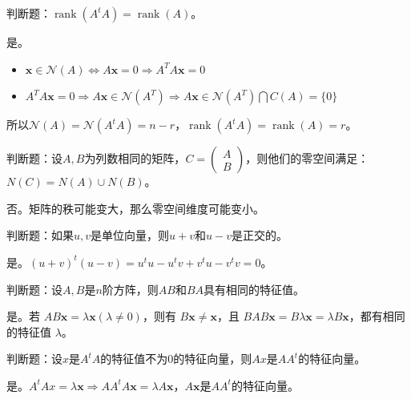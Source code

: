 \begin{problem}
	判断题：$\operatorname{rank}(A^tA)=\operatorname{rank}(A)$。
\end{problem}
\begin{solution}
	是。

	\begin{itemize}
		\item $\boldsymbol{x} \in \mathcal{N}(A) \Leftrightarrow A \boldsymbol{x}=0 \Rightarrow A^{T} A \boldsymbol{x}=0$
		\item $ A^{T} A \boldsymbol{x}=0 \Rightarrow A \boldsymbol{x} \in \mathcal{N}\left(A^{T}\right) \Rightarrow A \boldsymbol{x} \in \mathcal{N}\left(A^{T}\right) \bigcap C(A)=\{0\}$
	\end{itemize}
	
	所以$\mathcal{N}(A) = \mathcal{N}(A^tA) = n - r$，$\operatorname{rank}(A^tA) = \operatorname{rank}(A) = r$。
\end{solution}


\begin{problem}
	判断题：设$A,B$为列数相同的矩阵，$C=\begin{pmatrix}A\\B\end{pmatrix}$，则他们的零空间满足：$N(C)=N(A)\cup N(B)$。
\end{problem}
\begin{solution}
	否。矩阵的秩可能变大，那么零空间维度可能变小。
\end{solution}


\begin{problem}
	判断题：如果$u,v$是单位向量，则$u+v$和$u-v$是正交的。
\end{problem}
\begin{solution}
	是。$(u + v)^t(u - v) = u^tu - u^tv + v^tu - v^tv = 0$。
\end{solution}


\begin{problem}
	判断题：设$A,B$是$n$阶方阵，则$AB$和$BA$具有相同的特征值。
\end{problem}
\begin{solution}
	是。若 $AB\boldsymbol{x} = \lambda \boldsymbol{x}(\lambda \neq 0)$，则有 $B\boldsymbol{x} \neq \boldsymbol{x}$，且 $BAB\boldsymbol{x} = B\lambda\boldsymbol{x} = \lambda B\boldsymbol{x}$，都有相同的特征值 $\lambda$。
\end{solution}


\begin{problem}
	判断题：设$x$是$A^tA$的特征值不为$0$的特征向量，则$Ax$是$AA^t$的特征向量。
\end{problem}
\begin{solution}
	是。$A^tAx = \lambda\boldsymbol{x} \Longrightarrow AA^tA\boldsymbol{x} = \lambda A\boldsymbol{x}$，$A\boldsymbol{x}$是$AA^t$的特征向量。
\end{solution}


